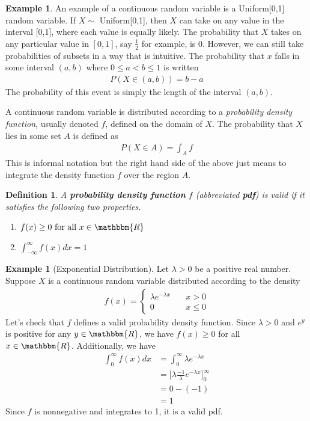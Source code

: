 \documentclass[11pt,letterpaper]{article}
\newcommand\real{\mathbbm{R}}
\numberwithin{theorem}{section}
\newtheorem{definition}[theorem]{Definition}
\numberwithin{definition}{section}
\numberwithin{lemma}{section}
\numberwithin{corollary}{section}
\numberwithin{proposition}{section}
\theoremstyle{definition}
\numberwithin{remark}{section}
\numberwithin{claim}{section}
\numberwithin{observation}{section}
\numberwithin{fact}{section}
\numberwithin{assumption}{section}
\newtheorem{example}[theorem]{Example}
\numberwithin{example}{section}
\numberwithin{exercise}{section}
\begin{document}
\begin{example}
An example of a continuous random variable is a Uniform[0,1] random variable. If $X \sim$ Uniform[0,1], then $X$ can take on any value in the interval [0,1], where each value is equally likely. The probability that $X$ takes on any particular value in $[0,1]$, say $\frac{1}{2}$ for example, is 0. However, we can still take probabilities of subsets in a way that is intuitive. The probability that $x$ falls in some interval $(a,b)$ where $0\leq a<b\leq 1$ is written
\begin{align*}
P(X \in (a,b)) = b-a
\end{align*}
The probability of this event is simply the length of the interval $(a,b)$.
\end{example}
A continuous random variable is distributed according to a \textit{probability density function}, usually denoted $f$, defined on the domain of $X$. The probability that $X$ lies in some set $A$ is defined as
\begin{align*}
P(X \in A) = \int_A f
\end{align*}
This is informal notation but the right hand side of the above just means to integrate the density function $f$ over the region $A$. 

\begin{definition}
A \textbf{probability density function} $f$ (abbreviated \textbf{pdf}) is valid if it satisfies the following two properties.
\begin{enumerate}
\item $f(x) \geq 0 \text{ for all } x \in \real$ 
\item $\int_{-\infty}^{\infty} f(x) dx = 1$
\end{enumerate}
\end{definition}

\begin{example}[Exponential Distribution]
Let $\lambda > 0$ be a positive real number. Suppose $X$ is a continuous random variable distributed according to the density
\begin{align*}
f(x) =\begin{cases}
 \lambda e^{-\lambda x} \hspace{1em} &x > 0 \\
 0 &x \leq 0
\end{cases}
\end{align*}
Let's check that $f$ defines a valid probability density function. Since $\lambda > 0$ and $e^{y}$ is positive for any $y \in \real$, we have $f(x) \geq 0$ for all $x \in \real$. Additionally, we have
\begin{align*}
\int_{0}^{\infty} f(x) dx &= \int_{0}^{\infty} \lambda e^{-\lambda x} \\
&= \Big[\lambda \frac{-1}{\lambda}e^{-\lambda x} \Big]^{\infty}_{0} \\
&= 0 -(-1) \\
&= 1
\end{align*}
Since $f$ is nonnegative and integrates to 1, it is a valid pdf.
\end{example}
\end{document}

